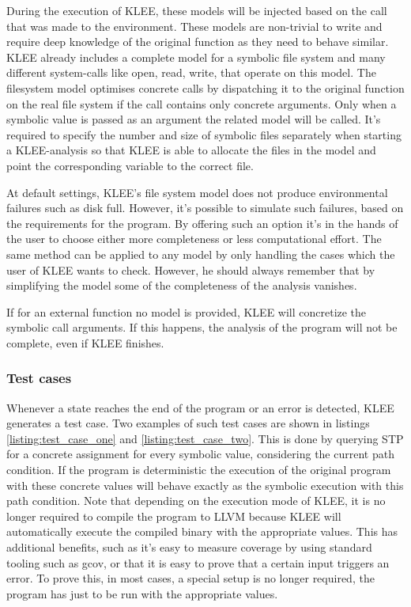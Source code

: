 During the execution of KLEE, these models will be injected based on the call that was made to the environment. These models are non-trivial to write and require deep knowledge of the original function as they need to behave similar. KLEE already includes a complete model for a symbolic file system and many different system-calls like open, read, write, that operate on this model.
The filesystem model optimises concrete calls by dispatching it to the original function on the real file system if the call contains only concrete arguments. Only when a symbolic value is passed as an argument the related model will be called. It's required to specify the number and size of symbolic files separately when starting a KLEE-analysis so that KLEE is able to allocate the files in the model and point the corresponding variable to the correct file.

At default settings, KLEE's file system model does not produce environmental failures such as disk full. However, it's possible to simulate such failures, based on the requirements for the program. By offering such an option it's in the hands of the user to choose either more completeness or less computational effort. The same method can be applied to any model by only handling the cases which the user of KLEE wants to check. However, he should always remember that by simplifying the model some of the completeness of the analysis vanishes.

If for an external function no model is provided, KLEE will concretize the symbolic call arguments. If this happens, the analysis of the program will not be complete, even if KLEE finishes.
\subsubsection{Test cases}
Whenever a state reaches the end of the program or an error is detected, KLEE generates a test case. Two examples of such test cases are shown in listings \ref{listing:test_case_one} and \ref{listing:test_case_two}. This is done by querying STP for a concrete assignment for every symbolic value, considering the current path condition. If the program is deterministic the execution of the original program with these concrete values will behave exactly as the symbolic execution with this path condition.
Note that depending on the execution mode of KLEE, it is no longer required to compile the program to LLVM because KLEE will automatically execute the compiled binary with the appropriate values. This has additional benefits, such as it's easy to measure coverage by using standard tooling such as gcov, or that it is easy to prove that a certain input triggers an error. To prove this, in most cases, a special setup is no longer required, the program has just to be run with the appropriate values.

